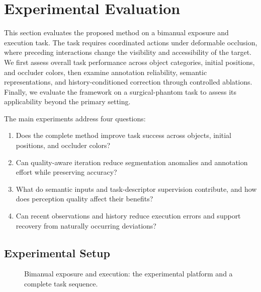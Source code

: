 \section{Experimental Evaluation}
\label{sec:experiments}
This section evaluates the proposed method on a bimanual exposure and execution task.
The task requires coordinated actions under deformable occlusion,
where preceding interactions change the visibility and accessibility of the target.
We first assess overall task performance across object categories, initial positions, and occluder colors,
then examine annotation reliability, semantic representations, and history-conditioned correction through controlled ablations.
Finally, we evaluate the framework on a surgical-phantom task to assess its applicability beyond the primary setting.

The main experiments address four questions:
\begin{enumerate}
\item Does the complete method improve task success across objects, initial positions, and occluder colors?
\item Can quality-aware iteration reduce segmentation anomalies and annotation effort while preserving accuracy?
\item What do semantic inputs and task-descriptor supervision contribute, and how does perception quality affect their benefits?
\item Can recent observations and history reduce execution errors and support recovery from naturally occurring deviations?
\end{enumerate}

\subsection{Experimental Setup}
\label{sec:evalprotocol}


\begin{figure}[!t]
\centering
\caption{Bimanual exposure and execution: the experimental platform and a complete task sequence.}
\label{fig:tasksetup}
\end{figure}


